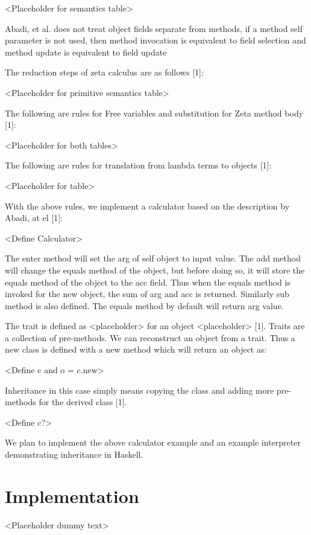 \documentclass[10pt,twocolumn]{article}
\begin{document}
<Placeholder for semantics table>

Abadi, et al. does not treat object fields separate from methods, if a method self parameter is not used, then method invocation is equivalent to field selection and method update is equivalent to field update

The reduction steps of zeta calculus are as follows [1]: 

<Placeholder for primitive semantics table>


The following are rules for Free variables and substitution for Zeta method body [1]: 

<Placeholder for both tables>


The following are rules for translation from lambda terms to objects [1]: 

<Placeholder for table>

With the above rules, we implement a calculator based on the description by Abadi, at el [1]: 

<Define Calculator>


The enter method will set the arg of self object to input value. The add method will change the equals method of the object, but before doing so, it will store the equals method of the object to the acc field. Thus when the equals method is invoked for the new object, the sum of arg and acc is returned. Similarly sub method is also defined. The equals method by default will return arg value. 

The trait is defined as  <placeholder> for an object <placeholder> [1]. Traits are a collection of pre-methods. We can reconstruct an object from a trait. Thus a new class is defined with a new method which will return an object as: 

<Define c and o = c.new>


Inheritance in this case simply means copying the class and adding more pre-methods for the derived class [1]. 

<Define c?>


We plan to implement the above calculator example and an example interpreter demonstrating inheritance in Haskell. 

\section{Implementation}

<Placeholder dummy text>
\end{document}
